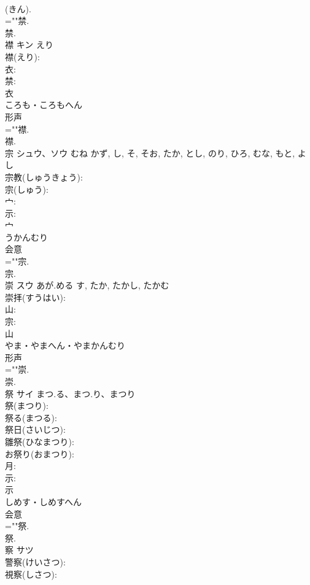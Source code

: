 \documentclass[8pt]{extreport}
\begin{document}
\begin{CJK}{UTF8}{min}
\\	(きん).
\\	=""禁.
\\	禁.
\\	襟	キン	えり		
\\	襟(えり): 
\\	衣: 
\\	禁: 
\\	衣	
\\	ころも・ころもへん	
\\	形声 
\\	=""襟.
\\	襟.
\\	宗	シュウ、ソウ	むね	かず, し, そ, そお, たか, とし, のり, ひろ, むな, もと, よし	
\\	宗教(しゅうきょう): 
\\	宗(しゅう): 
\\	宀: 
\\	示: 
\\	宀	
\\	うかんむり	
\\	会意 
\\	=""宗.
\\	宗.
\\	崇	スウ	あが.める	す, たか, たかし, たかむ	
\\	崇拝(すうはい): 
\\	山: 
\\	宗: 
\\	山	
\\	やま・やまへん・やまかんむり	
\\	形声 
\\	=""崇.
\\	崇.
\\	祭	サイ	まつ.る、まつ.り、まつり		
\\	祭(まつり): 
\\	祭る(まつる): 
\\	祭日(さいじつ): 
\\	雛祭(ひなまつり): 
\\	お祭り(おまつり): 
\\	月: 
\\	示: 
\\	示	
\\	しめす・しめすへん	
\\	会意 
\\	=""祭.
\\	祭.
\\	察	サツ			
\\	警察(けいさつ): 
\\	視察(しさつ): 

\end{CJK}
\end{document}
